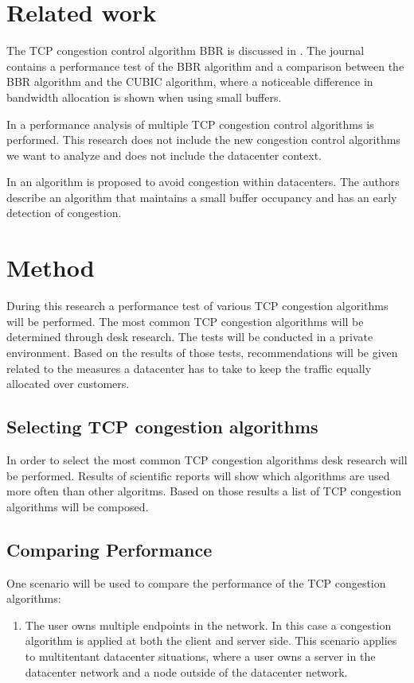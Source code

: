 \documentclass{article}
\begin{document}
\section{Related work}


The TCP congestion control algorithm BBR is discussed in \cite{bbr-congestion}.
The journal contains a performance test of the BBR algorithm and a comparison
between the BBR algorithm and the CUBIC algorithm, where a noticeable
difference in bandwidth allocation is shown when using small buffers.

In \cite{multiple-congestion} a performance analysis of multiple TCP congestion
control algorithms is performed. This research does not include the new
congestion control algorithms we want to analyze and does not include the
datacenter context.

In \cite{dctcp-congestion-original} an algorithm is proposed to avoid
congestion within datacenters. The authors describe an algorithm that maintains
a small buffer occupancy and has an early detection of congestion.

\section{Method}
During this research a performance test of various TCP congestion algorithms will be performed. The most common TCP congestion algorithms will be determined through desk research. The tests will be conducted in a private environment. Based on the results of those tests, recommendations will be given related to the measures a datacenter has to take to keep the traffic equally allocated over customers. 

	\subsection{Selecting TCP congestion algorithms}	
	In order to select the most common TCP congestion algorithms desk research will be performed. Results of scientific reports will show which algorithms are used more often than other algoritms. Based on those results a list of TCP congestion algorithms will be composed.	
	
	\subsection{Comparing Performance}
	One scenario will be used to compare the performance of the TCP congestion algorithms:
	\begin{enumerate}
		\item The user owns multiple endpoints in the network. In this case a congestion algorithm is applied at both the client and server side. This scenario applies to multitentant datacenter situations, where a user owns a server in the datacenter network and a node outside of the datacenter network.
	\end{enumerate}
	
\end{document}
